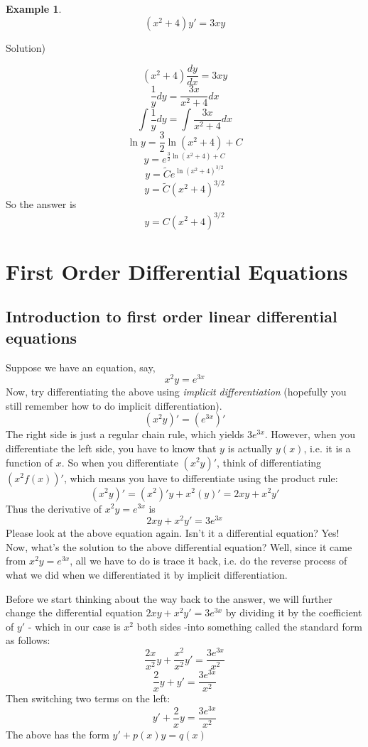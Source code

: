 \documentclass[12pt]{report}
\newtheorem{ex}{Example}[section]
\begin{document}
\begin{ex}
	$$(x^2+4) y' = 3xy$$
\end{ex}
Solution)

$$(x^2+4) \frac{dy}{dx} = 3xy$$
$$ \frac{1}{y} dy = \frac{3x}{x^2+4} dx $$
$$ \int \frac{1}{y} dy = \int \frac{3x}{x^2+4} dx $$
$$ \ln y = \frac{3}{2} \ln{(x^2+4)} +C $$
$$y = e^{\frac{3}{2} \ln{(x^2+4)} +C}$$
$$y = \tilde{C} e^{\ln{(x^2+4)^{3/2}}}$$
$$y = \tilde{C} (x^2+4)^{3/2}$$
So the answer is
$$y = C (x^2+4)^{3/2}$$

\section{First Order Differential Equations}
\subsection*{ Introduction to first order linear differential equations}
Suppose we have an equation, say,
$$x^2 y = e^{3x}$$
Now, try differentiating the above using \textit{implicit differentiation} (hopefully you still remember how to do implicit differentiation).
$$\left( x^2 y \right)' = \left( e^{3x} \right)'$$
The right side is just a regular chain rule, which yields $ 3 e^{3x} $. However, when you differentiate the left side, you have to know that $y$ is actually $y(x)$, i.e. it is a function of $x$. So when you differentiate $\left( x^2 y \right)'$, think of differentiating $\left( x^2 f(x) \right)'$, which means you have to differentiate using the product rule:
$$\left( x^2 y \right)'= \left( x^2 \right)' y  +  x^2 \left( y \right)' = 2xy + x^2 y' $$
Thus the derivative of $x^2 y = e^{3x}$ is
$$ 2xy + x^2 y'= 3 e^{3x} $$
Please look at the above equation again. Isn't it a differential equation? Yes! Now, what's the solution to the above differential equation? Well, since it came from $x^2 y = e^{3x}$, all we have to do is trace it back, i.e. do the reverse process of what we did when we differentiated it by implicit differentiation.

Before we start thinking about the way back to the answer, we will further change the differential equation $ 2xy + x^2 y'= 3 e^{3x} $ by dividing it by the coefficient of $y'$ - which in our case is $x^2$ both sides -into something called the standard form as follows:
$$ \frac{2x}{x^2} y + \frac{x^2}{x^2} y'= \frac{3 e^{3x}}{x^2} $$
$$ \frac{2}{x} y + y'= \frac{3 e^{3x}}{x^2} $$
Then switching two terms on the left:
$$  y'+ \frac{2}{x} y = \frac{3 e^{3x}}{x^2} $$
The above has the form $y'+p(x) y = q(x)$
\end{document}
